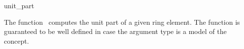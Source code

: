 \begin{ccRefFunction}{unit_part}

\ccDefinition

The function \ccRefName\ computes the unit part of a given ring 
element. 
The function is guaranteed to be well defined in case the argument type 
is a model of the  concept. 


{}


\ccSeeAlso

\\
\\

\end{ccRefFunction}

